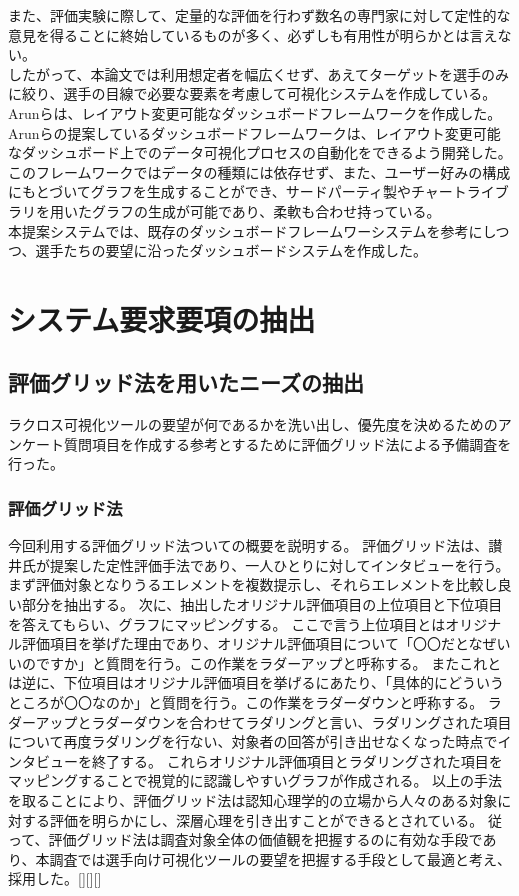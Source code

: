 \documentclass[sotsuron]{kuee}
\begin{document}
また、評価実験に際して、定量的な評価を行わず数名の専門家に対して定性的な意見を得ることに終始しているものが多く、必ずしも有用性が明らかとは言えない。
\\したがって、本論文では利用想定者を幅広くせず、あえてターゲットを選手のみに絞り、選手の目線で必要な要素を考慮して可視化システムを作成している。
\\Arunらは、レイアウト変更可能なダッシュボードフレームワークを作成した。
Arunらの提案しているダッシュボードフレームワークは、レイアウト変更可能なダッシュボード上でのデータ可視化プロセスの自動化をできるよう開発した。
このフレームワークではデータの種類には依存せず、また、ユーザー好みの構成にもとづいてグラフを生成することができ、サードパーティ製やチャートライブラリを用いたグラフの生成が可能であり、柔軟も合わせ持っている。
\\本提案システムでは、既存のダッシュボードフレームワーシステムを参考にしつつ、選手たちの要望に沿ったダッシュボードシステムを作成した。


\chapter{システム要求要項の抽出}
\section{評価グリッド法を用いたニーズの抽出}
ラクロス可視化ツールの要望が何であるかを洗い出し、優先度を決めるためのアンケート質問項目を作成する参考とするために評価グリッド法による予備調査を行った。
\subsection{評価グリッド法}
今回利用する評価グリッド法ついての概要を説明する。
評価グリッド法は、讃井氏が提案した定性評価手法であり、一人ひとりに対してインタビューを行う。
まず評価対象となりうるエレメントを複数提示し、それらエレメントを比較し良い部分を抽出する。
次に、抽出したオリジナル評価項目の上位項目と下位項目を答えてもらい、グラフにマッピングする。
ここで言う上位項目とはオリジナル評価項目を挙げた理由であり、オリジナル評価項目について「〇〇だとなぜいいのですか」と質問を行う。この作業をラダーアップと呼称する。
またこれとは逆に、下位項目はオリジナル評価項目を挙げるにあたり、「具体的にどういうところが〇〇なのか」と質問を行う。この作業をラダーダウンと呼称する。
ラダーアップとラダーダウンを合わせてラダリングと言い、ラダリングされた項目について再度ラダリングを行ない、対象者の回答が引き出せなくなった時点でインタビューを終了する。
これらオリジナル評価項目とラダリングされた項目をマッピングすることで視覚的に認識しやすいグラフが作成される。
以上の手法を取ることにより、評価グリッド法は認知心理学的の立場から人々のある対象に対する評価を明らかにし、深層心理を引き出すことができるとされている。
従って、評価グリッド法は調査対象全体の価値観を把握するのに有効な手段であり、本調査では選手向け可視化ツールの要望を把握する手段として最適と考え、採用した。[][][]
\end{document}
